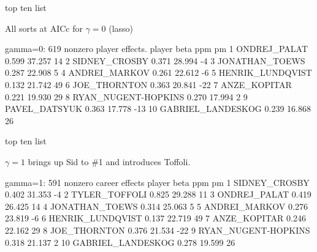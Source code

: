 \documentclass[11pt,xcolor=svgnames]{beamer}
\newcommand{\nv}{\color{Navy}}
\newcommand{\mr}[1]{\mathrm{#1}}
\begin{document}

\begin{frame}[fragile]{top ten list}

All sorts at AICc for $\gamma=0$ (lasso)

\begin{semiverbatim}\nv{}
 gamma=0: 619 nonzero player effects.
                 player  beta    ppm  pm
 1         ONDREJ_PALAT 0.599 37.257  14
 2        SIDNEY_CROSBY 0.371 28.994  -4
 3       JONATHAN_TOEWS 0.287 22.908   5
 4        ANDREI_MARKOV 0.261 22.612  -6
 5     HENRIK_LUNDQVIST 0.132 21.742  49
 6         JOE_THORNTON 0.363 20.841 -22
 7         ANZE_KOPITAR 0.221 19.930  29
 8  RYAN_NUGENT-HOPKINS 0.270 17.994   2
 9        PAVEL_DATSYUK 0.363 17.778 -13
 10   GABRIEL_LANDESKOG 0.239 16.868  26
\end{semiverbatim}


\end{frame}


\begin{frame}[fragile]{top ten list}

$\gamma=1$ brings up Sid to \#1 and introduces Toffoli.

\begin{semiverbatim}\nv{}
  gamma=1: 591 nonzero career effects
                 player  beta    ppm  pm
 1        SIDNEY_CROSBY 0.402 31.353  -4
 2        TYLER_TOFFOLI 0.825 29.288  11
 3         ONDREJ_PALAT 0.419 26.425  14
 4       JONATHAN_TOEWS 0.314 25.063   5
 5        ANDREI_MARKOV 0.276 23.819  -6
 6     HENRIK_LUNDQVIST 0.137 22.719  49
 7         ANZE_KOPITAR 0.246 22.162  29
 8         JOE_THORNTON 0.376 21.534 -22
 9  RYAN_NUGENT-HOPKINS 0.318 21.137   2
 10   GABRIEL_LANDESKOG 0.278 19.599  26
\end{semiverbatim}

\end{frame}
\end{document}

